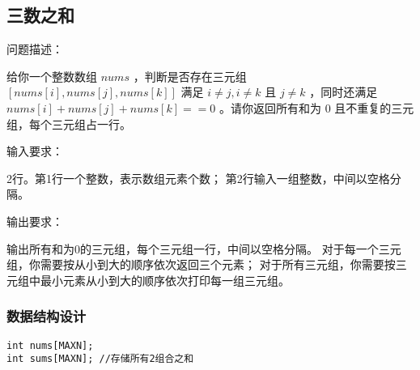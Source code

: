 \subsection{三数之和}
\begin{formal}
    {\cuhei 问题描述：}

    给你一个整数数组 $nums$ ，判断是否存在三元组 $[nums[i], nums[j], nums[k]]$ 满足 $i \neq j,i \neq k$ 且 $j \neq k$ ，同时还满足 $nums[i] + nums[j] + nums[k] == 0$ 。请你返回所有和为 0 且不重复的三元组，每个三元组占一行。
\end{formal}
\begin{formal}
    {\cuhei 输入要求：}

    2行。第1行一个整数，表示数组元素个数；
    第2行输入一组整数，中间以空格分隔。
\end{formal}
\begin{formal}
    {\cuhei 输出要求：}

    输出所有和为0的三元组，每个三元组一行，中间以空格分隔。
    对于每一个三元组，你需要按从小到大的顺序依次返回三个元素；
    对于所有三元组，你需要按三元组中最小元素从小到大的顺序依次打印每一组三元组。
\end{formal}
\subsubsection{数据结构设计}
\begin{lstlisting}[name=Q1]
int nums[MAXN];
int sums[MAXN]; //存储所有2组合之和
\end{lstlisting}
